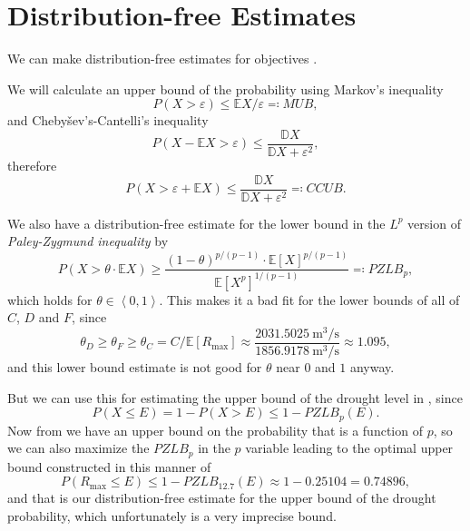 \section{Distribution-free Estimates}%
\label{sec:distribution-free_estimates}

We can make distribution-free estimates for objectives .

We will calculate an upper bound of the probability using Markov's inequality \[
    P(X > \varepsilon) \le \mathbb{E}X/\varepsilon \eqqcolon MUB,  
\] and Chebyšev's-Cantelli's inequality \[
    P(X - \mathbb{E}X > \varepsilon) \le \frac{\mathbb{D}X}{\mathbb{D}X + \varepsilon^2},
\]  therefore \[
     P(X > \varepsilon + \mathbb{E}X) \le \frac{\mathbb{D}X}{\mathbb{D}X + \varepsilon^2} \eqqcolon CCUB.
\] 
\begin{table}[H]
  
  \caption{Distribution-free estimates for }
  \label{tab:dist_free}
\end{table}

We also have a distribution-free estimate for the lower bound in the \(L^{p}\) version of 
\emph{Paley-Zygmund inequality} \cite{petrovLowerBoundsTail2007} by
\[
    P(X > \theta\cdot \mathbb{E}X) \ge \frac{(1-\theta)^{p/(p-1)} \cdot \mathbb{E}[X]^{p/(p-1)}}{\mathbb{E}[X^p]^{1/(p-1)}} \eqqcolon PZLB_{p},
\] which holds for \(\theta \in \left< 0, 1 \right>\). This makes it a bad fit for the lower bounds of all of \(C\), \(D\)
and \(F\), since
\[
    \theta_{D} \ge \theta_{F} \ge \theta_{C} = C/\mathbb{E}[R_{\max}] \approx \frac{\qty{2031.5025}{\metre\cubed\per\second}}{\qty{1856.9178}{\metre\cubed\per\second}}
    \approx 1.095,
\] and this lower bound estimate is not good for \(\theta\) near \(0\) and \(1\) anyway.

But we can use this for
estimating the upper bound of the drought level in , since
\begin{equation}
    \label{eq:PZLB_p}
    P(X \le E) = 1 - P(X > E) \le 1 - PZLB_{p}(E).
\end{equation}
Now from  we have an upper bound on the probability that is a function of \(p\), so we can also
maximize the \(PZLB_{p}\) in the \(p\) variable leading to the optimal upper bound constructed in this manner of \[
    P(R_{\max} \le E) \le 1 - PZLB_{12.7}(E) \approx 1 - 0.25104 = 0.74896,
\] and that is our distribution-free estimate for the upper bound of the drought probability, which unfortunately is
a very imprecise bound.

